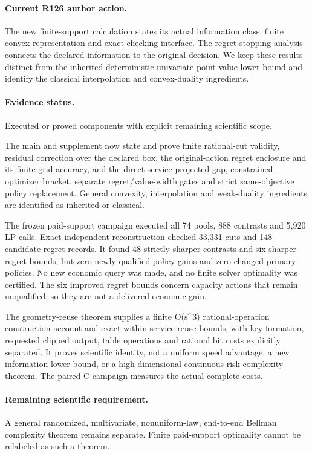 \paragraph{Current R126 author action.} The new finite-support calculation states its actual information class, finite convex representation and exact checking interface. The regret-stopping analysis connects the declared information to the original decision. We keep these results distinct from the inherited deterministic univariate point-value lower bound and identify the classical interpolation and convex-duality ingredients.

\paragraph{Evidence status.} Executed or proved components with explicit remaining scientific scope.

The main and supplement now state and prove finite rational-cut validity, residual correction over the declared box, the original-action regret enclosure and its finite-grid accuracy, and the direct-service projected gap, constrained optimizer bracket, separate regret/value-width gates and strict same-objective policy replacement. General convexity, interpolation and weak-duality ingredients are identified as inherited or classical.\par
The frozen paid-support campaign executed all 74 pools, 888 contrasts and 5,920 LP calls. Exact independent reconstruction checked 33,331 cuts and 148 candidate regret records. It found 48 strictly sharper contrasts and six sharper regret bounds, but zero newly qualified policy gains and zero changed primary policies. No new economic query was made, and no finite solver optimality was certified. The six improved regret bounds concern capacity actions that remain unqualified, so they are not a delivered economic gain.\par
The geometry-reuse theorem supplies a finite O(s\textasciicircum{}3) rational-operation construction account and exact within-service reuse bounds, with key formation, requested clipped output, table operations and rational bit costs explicitly separated. It proves scientific identity, not a uniform speed advantage, a new information lower bound, or a high-dimensional continuous-risk complexity theorem. The paired C campaign measures the actual complete costs.\par

\paragraph{Remaining scientific requirement.} A general randomized, multivariate, nonuniform-law, end-to-end Bellman complexity theorem remains separate. Finite paid-support optimality cannot be relabeled as such a theorem.

